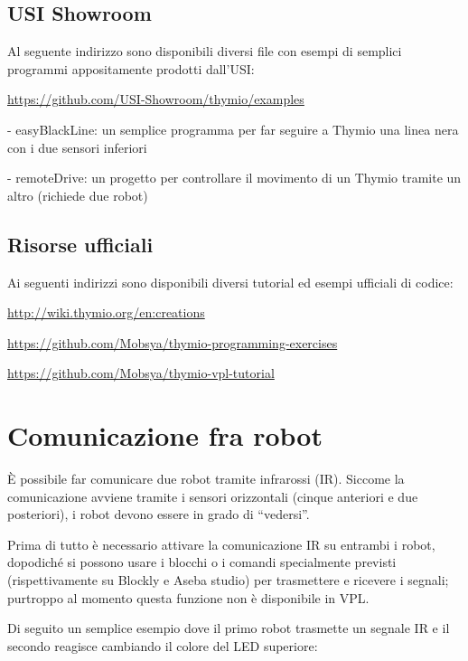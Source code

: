 \documentclass[12pt]{article}
\begin{document}
	\subsection{USI Showroom}
		
		Al seguente indirizzo sono disponibili diversi file con esempi di semplici programmi appositamente prodotti dall'USI:
		
		\url{https://github.com/USI-Showroom/thymio/examples}
		
		
		- easyBlackLine: un semplice programma per far seguire a Thymio una linea nera con i due sensori inferiori
		
		- remoteDrive: un progetto per controllare il movimento di un Thymio tramite un altro (richiede due robot)
		
	
	\subsection{Risorse ufficiali}
	
		Ai seguenti indirizzi sono disponibili diversi tutorial ed esempi ufficiali di codice:
	
		\url{http://wiki.thymio.org/en:creations}
		
		\url{https://github.com/Mobsya/thymio-programming-exercises}
		
		\url{https://github.com/Mobsya/thymio-vpl-tutorial}
	
	
\section{Comunicazione fra robot}\label{network}

	È possibile far comunicare due robot tramite infrarossi (IR). Siccome la comunicazione avviene tramite i sensori orizzontali (cinque anteriori e due posteriori), i robot devono essere in grado di ``vedersi''.
	
	Prima di tutto è necessario attivare la comunicazione IR su entrambi i robot, dopodiché si possono usare i blocchi o i comandi specialmente previsti (rispettivamente su Blockly e Aseba studio) per trasmettere e ricevere i segnali; purtroppo al momento questa funzione non è disponibile in VPL. 
	
	Di seguito un semplice esempio dove il primo robot trasmette un segnale IR e il secondo reagisce cambiando il colore del LED superiore: 
	
\end{document}
